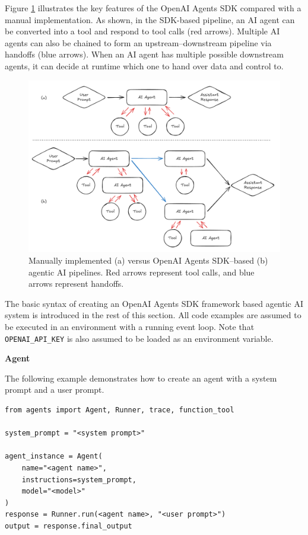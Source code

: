 Figure \ref{fig:openai_agents_sdk_pipeline} illustrates the key features of the OpenAI Agents SDK compared with a manual implementation. As shown, in the SDK-based pipeline, an AI agent can be converted into a tool and respond to tool calls (red arrows). Multiple AI agents can also be chained to form an upstream–downstream pipeline via handoffs (blue arrows). When an AI agent has multiple possible downstream agents, it can decide at runtime which one to hand over data and control to.

\begin{figure}[!htb]
	\centering
	\includegraphics[width=\textwidth]{./chapters/part-4/figures/openai_agents_sdk_pipeline.png}
	\caption{Manually implemented (a) versus OpenAI Agents SDK–based (b) agentic AI pipelines. Red arrows represent tool calls, and blue arrows represent handoffs.}
	\label{fig:openai_agents_sdk_pipeline}
\end{figure}

The basic syntax of creating an OpenAI Agents SDK framework based agentic AI system is introduced in the rest of this section. All code examples are assumed to be executed in an environment with a running event loop. Note that \verb|OPENAI_API_KEY| is also assumed to be loaded as an environment variable.

\vspace{0.1in}
\noindent \textbf{Agent}
\vspace{0.1in}

The following example demonstrates how to create an agent with a system prompt and a user prompt.

\begin{lstlisting}
from agents import Agent, Runner, trace, function_tool

system_prompt = "<system prompt>"

agent_instance = Agent(
    name="<agent name>",
    instructions=system_prompt,
    model="<model>"
)
response = Runner.run(<agent name>, "<user prompt>")
output = response.final_output
\end{lstlisting}

